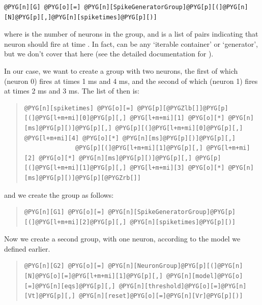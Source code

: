 \documentclass[letterpaper,10pt,english]{manual}
\begin{document}
\begin{Verbatim}[commandchars=@\[\]]
@PYG[n][G] @PYG[o][=] @PYG[n][SpikeGeneratorGroup]@PYG[p][(]@PYG[n][N]@PYG[p][,]@PYG[n][spiketimes]@PYG[p][)]
\end{Verbatim}

where  is the number of neurons in the group, and  is a
list of pairs  indicating that neuron  should fire at time .
In fact,  can be any `iterable container' or `generator',
but we don't cover that here (see the detailed documentation for
\hyperlink{brian.SpikeGeneratorGroup}{}).

In our case, we want to create a group with two neurons, the first
of which (neuron 0) fires at times 1 ms and 4 ms, and the second
of which (neuron 1) fires at times 2 ms and 3 ms. The list of
 then is:
\begin{quote}

\begin{Verbatim}[commandchars=@\[\]]
@PYG[n][spiketimes] @PYG[o][=] @PYG[p][@PYGZlb[]]@PYG[p][(]@PYG[l+m+mi][0]@PYG[p][,] @PYG[l+m+mi][1] @PYG[o][*] @PYG[n][ms]@PYG[p][)]@PYG[p][,] @PYG[p][(]@PYG[l+m+mi][0]@PYG[p][,] @PYG[l+m+mi][4] @PYG[o][*] @PYG[n][ms]@PYG[p][)]@PYG[p][,]
              @PYG[p][(]@PYG[l+m+mi][1]@PYG[p][,] @PYG[l+m+mi][2] @PYG[o][*] @PYG[n][ms]@PYG[p][)]@PYG[p][,] @PYG[p][(]@PYG[l+m+mi][1]@PYG[p][,] @PYG[l+m+mi][3] @PYG[o][*] @PYG[n][ms]@PYG[p][)]@PYG[p][@PYGZrb[]]
\end{Verbatim}
\end{quote}

and we create the group as follows:
\begin{quote}

\begin{Verbatim}[commandchars=@\[\]]
@PYG[n][G1] @PYG[o][=] @PYG[n][SpikeGeneratorGroup]@PYG[p][(]@PYG[l+m+mi][2]@PYG[p][,] @PYG[n][spiketimes]@PYG[p][)]
\end{Verbatim}
\end{quote}

Now we create a second group, with one neuron, according to the
model we defined earlier.
\begin{quote}

\begin{Verbatim}[commandchars=@\[\]]
@PYG[n][G2] @PYG[o][=] @PYG[n][NeuronGroup]@PYG[p][(]@PYG[n][N]@PYG[o][=]@PYG[l+m+mi][1]@PYG[p][,] @PYG[n][model]@PYG[o][=]@PYG[n][eqs]@PYG[p][,] @PYG[n][threshold]@PYG[o][=]@PYG[n][Vt]@PYG[p][,] @PYG[n][reset]@PYG[o][=]@PYG[n][Vr]@PYG[p][)]
\end{Verbatim}
\end{quote}
\end{document}
